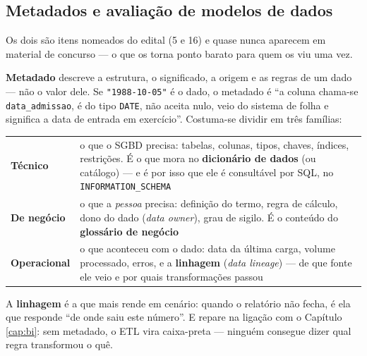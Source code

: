\subsection{Metadados e avaliação de modelos de dados}

Os dois são itens nomeados do edital (5 e 16) e quase nunca aparecem em
material de concurso --- o que os torna ponto barato para quem os viu uma vez.

\begin{conceito}
\textbf{Metadado} descreve a estrutura, o significado, a origem e as regras de
um dado --- não o valor dele. Se \texttt{"1988-10-05"} é o dado, o metadado é
``a coluna chama-se \texttt{data\_admissao}, é do tipo \texttt{DATE}, não
aceita nulo, veio do sistema de folha e significa a data de entrada em
exercício''. Costuma-se dividir em três famílias:

\begin{center}
\begin{tabular}{@{}p{2.6cm}p{9cm}@{}}
\toprule
\textbf{Técnico} & o que o SGBD precisa: tabelas, colunas, tipos, chaves,
índices, restrições. É o que mora no \textbf{dicionário de dados} (ou catálogo)
--- e é por isso que ele é consultável por SQL, no
\texttt{INFORMATION\_SCHEMA} \\
\textbf{De negócio} & o que a \emph{pessoa} precisa: definição do termo,
regra de cálculo, dono do dado (\emph{data owner}), grau de sigilo. É o
conteúdo do \textbf{glossário de negócio} \\
\textbf{Operacional} & o que aconteceu com o dado: data da última carga, volume
processado, erros, e a \textbf{linhagem} (\emph{data lineage}) --- de que fonte
ele veio e por quais transformações passou \\
\bottomrule
\end{tabular}
\end{center}

A \textbf{linhagem} é a que mais rende em cenário: quando o relatório não
fecha, é ela que responde ``de onde saiu este número''. E repare na ligação
com o Capítulo \ref{cap:bi}: sem metadado, o ETL vira caixa-preta --- ninguém
consegue dizer qual regra transformou o quê.
\end{conceito}


